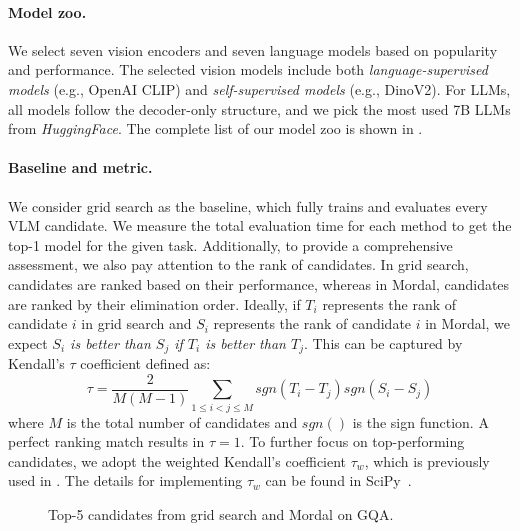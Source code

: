 \paragraph{Model zoo.} We select seven vision encoders and seven language models based on popularity and performance. The selected vision models include both \textit{language-supervised models} (e.g., OpenAI CLIP) and \textit{self-supervised models} (e.g., DinoV2). For LLMs, all models follow the decoder-only structure, and we pick the most used 7B LLMs from \textit{HuggingFace}. The complete list of our model zoo is shown in .



\paragraph{Baseline and metric.} We consider grid search as the baseline, which fully trains and evaluates every VLM candidate. We measure the total evaluation time for each method to get the top-1 model for the given task. 
Additionally, to provide a comprehensive assessment, we also pay attention to the rank of candidates. In grid search, candidates are ranked based on their performance, whereas in Mordal, candidates are ranked by their elimination order. Ideally, if $T_i$ represents the rank of candidate $i$ in grid search and $S_i$ represents the rank of candidate $i$ in Mordal, we expect \textit{$S_i$ is better than $S_j$ if $T_i$ is better than $T_j$}. This can be captured by Kendall's $\tau$ coefficient defined as:
\begin{equation}
    \tau = \frac{2}{M(M-1)}\sum_{1 \leq i < j \leq M} sgn(T_i - T_j) sgn(S_i - S_j)
\end{equation}
where $M$ is the total number of candidates and $sgn()$ is the sign function. A perfect ranking match results in $\tau=1$. To further focus on top-performing candidates, we adopt the weighted Kendall's coefficient $\tau_{w}$, which is previously used in \cite{you2021logme,vigna2015weighted}. The details for implementing $\tau_{w}$ can be found in SciPy~\cite{2020SciPy-NMeth}.



\begin{figure}[!t]
\centering
\caption{Top-5 candidates from grid search and Mordal on GQA.}
\label{fig:rank_GQA}
\end{figure}


